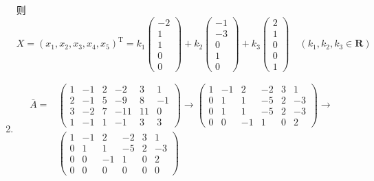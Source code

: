 \begin{enumerate}
        则
        \begin{equation*}
            X = (x_1, x_2, x_3, x_4, x_5)^\mathrm{T} = k_1 \begin{pmatrix} -2 \\ 1 \\ 1 \\ 0 \\ 0 \end{pmatrix}
            + k_2 \begin{pmatrix} -1 \\ -3 \\ 0 \\ 1 \\ 0 \end{pmatrix}
            + k_3 \begin{pmatrix} 2 \\ 1 \\ 0 \\ 0 \\ 1 \end{pmatrix}
            \quad(k_1, k_2, k_3 \in \mathbf{R})
        \end{equation*}
    \item
        \begin{align*}
            \bar{A}=&
            \begin{pmatrix}
                1 & -1 & 2 & -2  & 3  & 1 \\
                2 & -1 & 5 & -9  & 8  & -1 \\
                3 & -2 & 7 & -11 & 11 & 0 \\
                1 & -1 & 1 & -1  & 3  & 3
            \end{pmatrix}
            \rightarrow
            \begin{pmatrix}
                1 & -1 & 2  & -2  & 3 & 1 \\
                0 & 1  & 1  & -5  & 2 & -3 \\
                0 & 1  & 1  & -5  & 2 & -3 \\
                0 & 0  & -1 &  1  & 0 & 2
            \end{pmatrix}
            \rightarrow \\
             &
            \begin{pmatrix}
                1 & -1 & 2  & -2  & 3 & 1 \\
                0 & 1  & 1  & -5  & 2 & -3 \\
                0 & 0  & -1 &  1  & 0 & 2 \\
                0 & 0  & 0  &  0  & 0 & 0

\end{pmatrix}
\end{align*}
\end{enumerate}
